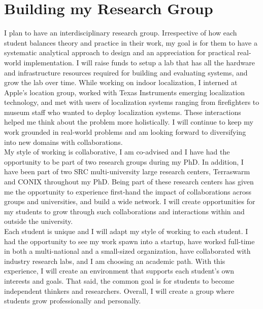 \documentclass[10pt]{article}
\begin{document}
\section{Building my Research Group}
I plan to have an interdisciplinary research group. Irrespective of how each student balances theory and practice in their work, my goal is for them to have a systematic analytical approach to design and an appreciation for practical real-world implementation. I will raise funds to setup a lab that has all the hardware and infrastructure resources required for building and evaluating systems, and grow the lab over time.  While working on indoor localization, I interned at Apple's location group, worked with Texas Instruments emerging localization technology, and met with users of localization systems ranging from firefighters to museum staff who wanted to deploy localization systems. These interactions helped me think about the problem more holistically.  I will continue to keep my work grounded in real-world problems and am looking forward to diversifying into new domains with collaborations.  \\

My style of working is collaborative, I am co-advised and I have had the opportunity to be part of two research groups during my PhD. %
In addition, I have been part of two SRC multi-university large research centers, Terraswarm and CONIX throughout my PhD. Being part of these research centers has given me the opportunity to experience first-hand the impact of collaborations across groups and universities, and build a wide network. I will create opportunities for my students to grow through such collaborations and interactions within and outside the university.  \\

Each student is unique and I will adapt my style of working to each student.  %
I had the opportunity to see my work spawn into a startup, have worked full-time in both a multi-national and a small-sized organization, have collaborated with industry research labs, and I am choosing an academic path. With this experience, I will create an environment that supports each student's own interests and goals. That said, the common goal is for students to become independent thinkers and researchers. %
 Overall, I will create a group where students grow professionally and personally.\\
\end{document}

